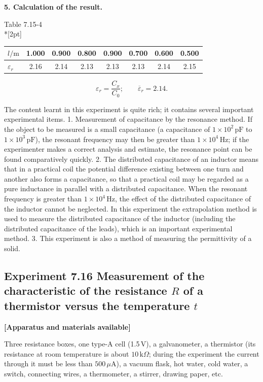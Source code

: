 \textbf{5. Calculation of the result.}

\begin{center}
{\small Table 7.15-4}\\*[2pt]
\begin{tabular}{lccccccc}
\toprule
$l/\mathrm{m}$ & 1.000 & 0.900 & 0.800 & 0.900 & 0.700 & 0.600 & 0.500\\
\midrule
$\varepsilon_r$ & 2.16 & 2.14 & 2.13 & 2.13 & 2.13 & 2.14 & 2.15\\
\bottomrule
\end{tabular}
\end{center}

\[
\varepsilon_r=\frac{C_x}{C_0};\qquad \overline{\varepsilon}_r=2.14.
\]

\begin{commentary}
The content learnt in this experiment is quite rich; it contains several important experimental items. 1. Measurement of capacitance by the resonance method. If the object to be measured is a small capacitance (a capacitance of $1\times10^2\,\mathrm{pF}$ to $1\times10^3\,\mathrm{pF}$), the resonant frequency may then be greater than $1\times10^4\,\mathrm{Hz}$; if the experimenter makes a correct analysis and estimate, the resonance point can be found comparatively quickly. 2. The distributed capacitance of an inductor means that in a practical coil the potential difference existing between one turn and another also forms a capacitance, so that a practical coil may be regarded as a pure inductance in parallel with a distributed capacitance. When the resonant frequency is greater than $1\times10^4\,\mathrm{Hz}$, the effect of the distributed capacitance of the inductor cannot be neglected. In this experiment the extrapolation method is used to measure the distributed capacitance of the inductor (including the distributed capacitance of the leads), which is an important experimental method. 3. This experiment is also a method of measuring the permittivity of a solid.
\end{commentary}

\subsection*{Experiment 7.16 \quad Measurement of the characteristic of the resistance $R$ of a thermistor versus the temperature $t$}

\textbf{[Apparatus and materials available]}

Three resistance boxes, one type-A cell (1.5\,V), a galvanometer, a thermistor (its resistance at room temperature is about $10\,\mathrm{k}\Omega$; during the experiment the current through it must be less than $500\,\mu\mathrm{A}$), a vacuum flask, hot water, cold water, a switch, connecting wires, a thermometer, a stirrer, drawing paper, etc.


